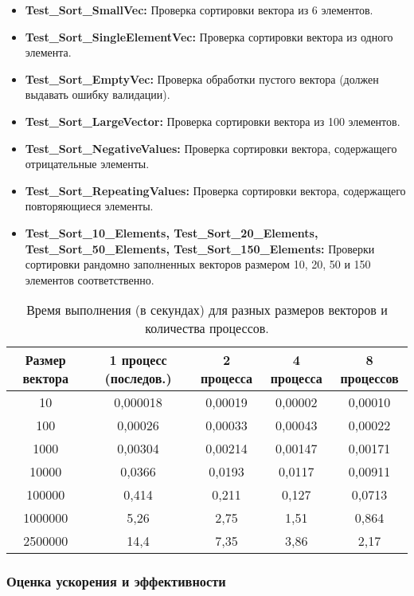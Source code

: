 \documentclass[12pt]{article}
\begin{document}
\begin{itemize}
    \item \textbf{Test\_Sort\_SmallVec:} Проверка сортировки вектора из 6 элементов.
    \item \textbf{Test\_Sort\_SingleElementVec:} Проверка сортировки вектора из одного элемента.
    \item \textbf{Test\_Sort\_EmptyVec:} Проверка обработки пустого вектора (должен выдавать ошибку валидации).
    \item \textbf{Test\_Sort\_LargeVector:} Проверка сортировки вектора из 100 элементов.
    \item \textbf{Test\_Sort\_NegativeValues:} Проверка сортировки вектора, содержащего отрицательные элементы.
    \item \textbf{Test\_Sort\_RepeatingValues:} Проверка сортировки вектора, содержащего повторяющиеся элементы.
    \item \textbf{Test\_Sort\_10\_Elements, Test\_Sort\_20\_Elements, Test\_Sort\_50\_Elements, Test\_Sort\_150\_Elements:} Проверки сортировки рандомно заполненных векторов размером 10, 20, 50 и 150 элементов соответственно.
\end{itemize}
\begin{table}[htbp]
\centering
\caption{Время выполнения (в секундах) для разных размеров векторов и количества процессов.}
    \label{tab:time}
    \begin{tabular}{|c|c|c|c|c|}
    \hline
    \toprule
    Размер вектора & 1 процесс (последов.) & 2 процесса & 4 процесса & 8 процессов\\ \hline
    \midrule
    10 & 0,000018 & 0,00019 & 0,00002 & 0,00010 \\ \hline
    100 & 0,00026 & 0,00033 & 0,00043 & 0,00022  \\ \hline
    1000 & 0,00304 & 0,00214 & 0,00147 & 0,00171  \\ \hline
    10000 & 0,0366 & 0,0193 & 0,0117 & 0,00911  \\ \hline
    100000 & 0,414 & 0,211 & 0,127 & 0,0713 \\ \hline
    1000000 & 5,26 & 2,75 & 1,51 & 0,864  \\ \hline
    2500000 & 14,4 & 7,35 & 3,86 & 2,17 \\ \hline
    \bottomrule
    \end{tabular}
\end{table}
\subsubsection*{Оценка ускорения и эффективности}
\end{document}
